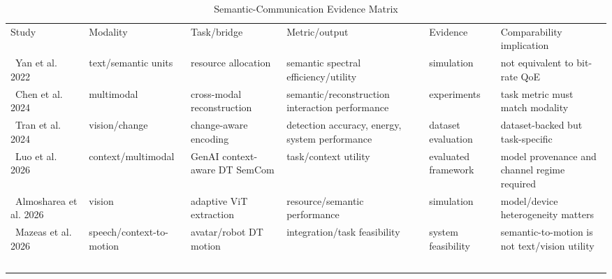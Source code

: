 \begin{table}[!t]\centering\caption{Semantic-Communication Evidence Matrix}\label{tab:semanticmatrix}\scriptsize\begin{tabularx}{\textwidth}{p{}p{}p{}p{}p{}Y}\toprule Study & Modality & Task/bridge & Metric/output & Evidence & Comparability implication \\\ \midrule Yan et al. 2022 & text/semantic units & resource allocation & semantic spectral efficiency/utility & simulation & not equivalent to bit-rate QoE \\\ Chen et al. 2024 & multimodal & cross-modal reconstruction & semantic/reconstruction interaction performance & experiments & task metric must match modality \\\ Tran et al. 2024 & vision/change & change-aware encoding & detection accuracy, energy, system performance & dataset evaluation & dataset-backed but task-specific \\\ Luo et al. 2026 & context/multimodal & GenAI context-aware DT SemCom & task/context utility & evaluated framework & model provenance and channel regime required \\\ Almosharea et al. 2026 & vision & adaptive ViT extraction & resource/semantic performance & simulation & model/device heterogeneity matters \\\ Mazeas et al. 2026 & speech/context-to-motion & avatar/robot DT motion & integration/task feasibility & system feasibility & semantic-to-motion is not text/vision utility \\\ \bottomrule\end{tabularx}\end{table}